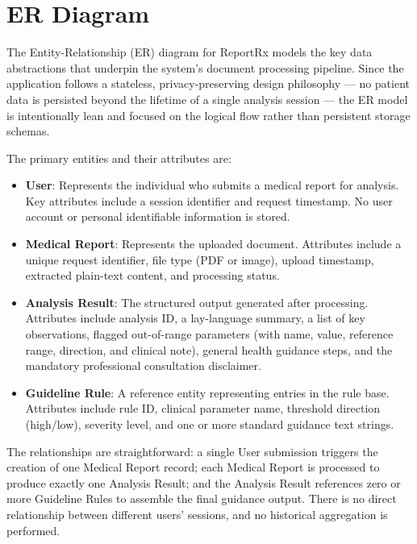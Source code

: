 \documentclass[12pt,a4paper]{report}
\begin{document}
\section{ER Diagram}
The Entity-Relationship (ER) diagram for ReportRx models the key data abstractions that underpin the system's document processing pipeline. Since the application follows a stateless, privacy-preserving design philosophy --- no patient data is persisted beyond the lifetime of a single analysis session --- the ER model is intentionally lean and focused on the logical flow rather than persistent storage schemas.

The primary entities and their attributes are:

\begin{itemize}
    \item \textbf{User}: Represents the individual who submits a medical report for analysis. Key attributes include a session identifier and request timestamp. No user account or personal identifiable information is stored.
    \item \textbf{Medical Report}: Represents the uploaded document. Attributes include a unique request identifier, file type (PDF or image), upload timestamp, extracted plain-text content, and processing status.
    \item \textbf{Analysis Result}: The structured output generated after processing. Attributes include analysis ID, a lay-language summary, a list of key observations, flagged out-of-range parameters (with name, value, reference range, direction, and clinical note), general health guidance steps, and the mandatory professional consultation disclaimer.
    \item \textbf{Guideline Rule}: A reference entity representing entries in the rule base. Attributes include rule ID, clinical parameter name, threshold direction (high/low), severity level, and one or more standard guidance text strings.
\end{itemize}

The relationships are straightforward: a single User submission triggers the creation of one Medical Report record; each Medical Report is processed to produce exactly one Analysis Result; and the Analysis Result references zero or more Guideline Rules to assemble the final guidance output. There is no direct relationship between different users' sessions, and no historical aggregation is performed.
\end{document}
